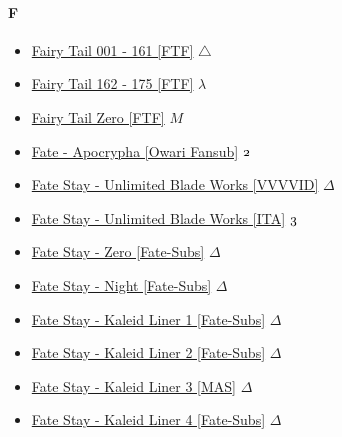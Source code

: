 		\paragraph{F} \hypertarget{SF}{}
			\begin{itemize}
				\item \href{https://mega.nz/#F!roFQWLxZ!s3vCeA-lnPj43ufYI44Amg} {Fairy Tail 001 - 161 [FTF]}  $\triangle$ \\
				\item \href{https://mega.nz/#F!ywgwHJjD!Ds1b8_fUBBTcvC-P_XCqHg} {Fairy Tail 162 - 175 [FTF]}  $\lambda$ \\
				\item \href{https://mega.nz/#F!JngBCQwB!w-cl1zhFTfADZOFw5XqqUw} {Fairy Tail Zero  [FTF]}  $M$ \\
				\item \href{https://mega.nz/#F!CHhgySaa!N-HzJdW2LankMRTpLCEoTQ} {Fate - Apocrypha [Owari Fansub]}  $\oldstylenums{2}$ \\
				\item \href{https://mega.nz/#F!aIRVQJwD!EPMRuakg8FQqpgP2pedWXQ} {Fate Stay - Unlimited Blade Works  [VVVVID]}  $\Delta$ \\
				\item \href{https://mega.nz/#F!rCoSTJSD!clJ8tJ69LMnY-Ym9QMFDhA} {Fate Stay - Unlimited Blade Works  [ITA]}  $\oldstylenums{3}$ \\
				\item \href{https://mega.nz/#F!yNYCWCTI!fTIfEN9LTOprv-1lTDQ5gQ} {Fate Stay - Zero [Fate-Subs]}  $\Delta$ \\
				\item \href{https://mega.nz/#F!fRRjDSBK!e7t2dz0obRwQRJ3CSSgtOw} {Fate Stay - Night [Fate-Subs]}  $\Delta$ \\
				\item \href{https://mega.nz/#F!GJwwXCxS!FwXZ2exvsa5W-DF4lCeXzA} {Fate Stay - Kaleid Liner 1  [Fate-Subs]}  $\Delta$ \\
				\item \href{https://mega.nz/#F!bMgyQYwb!JASNRC61nAvbHhsjDivBbA} {Fate Stay - Kaleid Liner 2 [Fate-Subs]}  $\Delta$ \\
				\item \href{https://mega.nz/#F!vNxjnJAQ!lGpqvKFBDJvlvx-23CRGbA} {Fate Stay - Kaleid Liner 3 [MAS]}  $\Delta$ \\
				\item \href{https://mega.nz/#F!uIQAxb4K!cITER9vHhqcjpAK9H91gWQ} {Fate Stay - Kaleid Liner 4 [Fate-Subs]}  $\Delta$ \\

\end{itemize}
